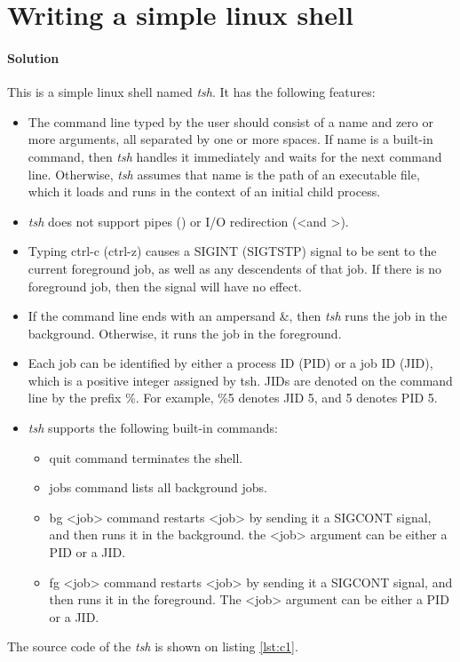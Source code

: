 \documentclass{article}
\newcommand\mylstcaption{}
\begin{document}
\section{Writing a simple linux shell}
\paragraph{Solution}
This is a simple linux shell named \textit{tsh}. It has the following features:
\begin{itemize}
    \item The command line typed by the user should consist of a name and zero or more arguments, 
    all separated by one or more spaces. 
    If name is a built-in command, then \textit{tsh} handles it immediately
    and waits for the next command line. Otherwise, \textit{tsh} assumes that name is the path of an
    executable file, which it loads and runs in the context of an initial child process.
    \item \textit{tsh} does not support pipes (\textbar) or I/O redirection (\textless \space and \textgreater).
    \item Typing \textsf{ctrl-c} (\textsf{ctrl-z}) causes a SIGINT (SIGTSTP) signal to be sent to the current foreground job, 
    as well as any descendents of that job. If there is no foreground job, then the signal will have no effect.
    \item If the command line ends with an ampersand \&, then \textit{tsh} runs the job in the background.
    Otherwise, it runs the job in the foreground.
    \item Each job can be identified by either a process ID (PID) or a job ID (JID), which is a positive integer 
    assigned by \textsf{tsh}. JIDs are denoted on the command line by the prefix \textsf{\%}. For example, \textsf{\%5} 
    denotes JID 5, and \textsf{5} denotes PID 5.
    \item \textit{tsh} supports the following built-in commands:
    \begin{itemize}
        \item \textsf{quit} command terminates the shell.
        \item \textsf{jobs} command lists all background jobs.
        \item \textsf{bg \textless job\textgreater} command restarts \textsf{\textless job\textgreater} 
        by sending it a SIGCONT signal, and then runs it in the background. 
        the \textsf{\textless job\textgreater} argument can be either a PID or a JID.
        \item \textsf{fg \textless job\textgreater} command restarts \textsf{\textless job\textgreater} 
        by sending it a SIGCONT signal, and then runs it in
the foreground. The \textsf{\textless job\textgreater} argument can be either a PID or a JID.
    \end{itemize}
\end{itemize}
The source code of the \textit{tsh} is shown on listing \ref{lst:c1}.
\renewcommand\mylstcaption{\textit{tsh}.c}
\begin{mdlisting}
    
\end{mdlisting}
\end{document}
